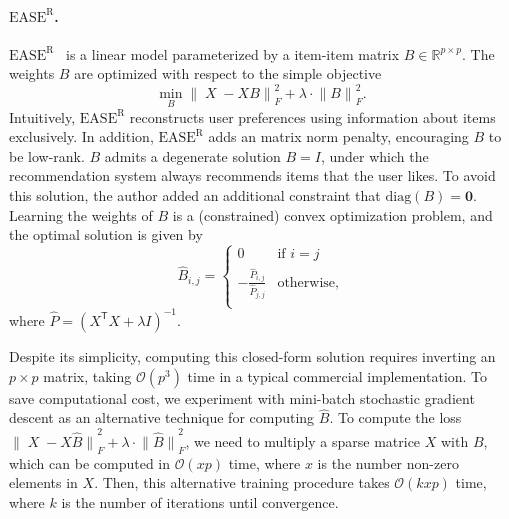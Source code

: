 \documentclass{article}
\DeclareMathOperator{\X}{\mathit{X}}
\newcommand{\easer}{$\text{EASE}^\text{R}$\xspace}
\newcommand{\norm}[1]{\ensuremath{\lVert #1 \rVert}}
\newcommand{\transpose}[1]{{#1}^\mathsf{T}}
\begin{document}
\paragraph*{\easer.}
\easer~\citep{steckEmbarrassinglyShallowAutoencoders2019}
is a linear model parameterized by a item-item matrix $B \in
	\mathbb{R}^{p \times p}$.
The weights $B$ are optimized with respect to the simple objective
 \begin{equation} \min_B \norm{\X - X B}_F^2 + \lambda \cdot \norm{B}_F^2
 \text{.
}
\end{equation}
Intuitively, \easer reconstructs user preferences using information about items
 exclusively.
In addition, \easer adds an matrix norm penalty, encouraging $B$ to be
 low-rank.
$B$ admits a degenerate solution $B = I$, under which the
recommendation system always recommends items that the user likes.
To avoid this solution, the author added an additional constraint that
 $\mathrm{diag}(B) = \mathbf{0}$.
Learning the weights of $B$ is a (constrained) convex optimization problem, and
 the optimal solution is given by  \begin{equation} \hat{B}_{i, j} =
	 \begin{cases} 0 & \text{if $i = j$} \\ -\frac{\hat{P}_{i, j}}{\hat{P}_{j, j}} &
               \text{otherwise,}     \\\end{cases} \end{equation} where $\hat{P} =
	 (\transpose{X} X + \lambda I)^{-1}$.

Despite its simplicity, computing this closed-form solution requires inverting
 an $p \times p$ matrix, taking $\mathcal{O}(p^3)$ time in a typical commercial
 implementation.
To save computational cost, we experiment with mini-batch stochastic gradient
 descent as an alternative technique for computing $\hat{B}$.
To compute the loss $\norm{\X - X \hat{B}}_F^2 + \lambda \cdot
	 \norm{\hat{B}}_F^2$, we need to multiply a sparse matrice $X$ with $B$, which
 can be computed in $\mathcal{O}(x p)$ time, where $x$ is the number non-zero
 elements in $X$.
Then, this alternative training procedure takes $\mathcal{O}(kxp)$ time, where
 $k$ is the number of iterations until convergence.
\end{document}

